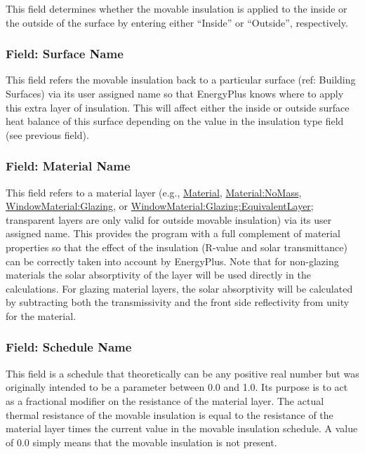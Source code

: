 This field determines whether the movable insulation is applied to the inside or the outside of the surface by entering either ``Inside'' or ``Outside'', respectively.

\subsubsection{Field: Surface Name}\label{field-surface-name-1}

This field refers the movable insulation back to a particular surface (ref: Building Surfaces) via its user assigned name so that EnergyPlus knows where to apply this extra layer of insulation. This will affect either the inside or outside surface heat balance of this surface depending on the value in the insulation type field (see previous field).

\subsubsection{Field: Material Name}\label{field-material-name}

This field refers to a material layer (e.g., \hyperref[material]{Material}, \hyperref[materialnomass]{Material:NoMass}, \hyperref[windowmaterialglazing]{WindowMaterial:Glazing}, or \hyperref[windowmaterialglazingequivalentlayer]{WindowMaterial:Glazing:EquivalentLayer}; transparent layers are only valid for outside movable insulation) via its user assigned name. This provides the program with a full complement of material properties so that the effect of the insulation (R-value and solar transmittance) can be correctly taken into account by EnergyPlus.  Note that for non-glazing materials the solar absorptivity of the layer will be used directly in the calculations.  For glazing material layers, the solar absorptivity will be calculated by subtracting both the transmissivity and the front side reflectivity from unity for the material.

\subsubsection{Field: Schedule Name}\label{field-schedule-name}

This field is a schedule that theoretically can be any positive real number but was originally intended to be a parameter between 0.0 and 1.0. Its purpose is to act as a fractional modifier on the resistance of the material layer. The actual thermal resistance of the movable insulation is equal to the resistance of the material layer times the current value in the movable insulation schedule. A value of 0.0 simply means that the movable insulation is not present.

